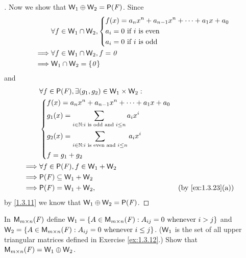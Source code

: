 \begin{proof}[]
	Now we show that \(\W_1 \oplus \W_2 = \ps{\F}\).
	Since
	\begin{align*}
		         & \forall f \in \mathsf{W}_1 \cap \mathsf{W}_2, \begin{dcases}
			                                         f(x) = a_n x^n + a_{n - 1} x^n + \cdots + a_1 x + a_0 \\
			                                         a_i = 0 \text{ if } i \text{ is even}                 \\
			                                         a_i = 0 \text{ if } i \text{ is odd}
		                                         \end{dcases} \\
		\implies & \forall f \in \mathsf{W}_1 \cap \mathsf{W}_2, f = \mathit{0}                                               \\
		\implies & \mathsf{W}_1 \cap \mathsf{W}_2 = \left\lbrace\mathit{0}\right\rbrace
	\end{align*}
	and
	\begin{align*}
		         & \forall f \in \ps{\F}, \exists (g_1, g_2) \in \W_1 \times \W_2 :                                 \\
		         & \begin{dcases}
			           f(x) = a_n x^n + a_{n - 1} x^n + \cdots + a_1 x + a_0              \\
			           g_1(x) = \sum_{i \in \N : i \text{ is odd and } i \leq n} a_i x^i  \\
			           g_2(x) = \sum_{i \in \N : i \text{ is even and } i \leq n} a_i x^i \\
			           f = g_1 + g_2
		           \end{dcases}                           \\
		\implies & \forall f \in \ps{\F}, f \in \W_1 + \W_2                                                         \\
		\implies & \ps{\F} \subseteq \W_1 + \W_2                                                                    \\
		\implies & \ps{\F} = \W_1 + \W_2,                                                    &  & \by{ex:1.3.23}[a]
	\end{align*}
	by \cref{1.3.11} we know that \(\W_1 \oplus \W_2 = \ps{\F}\).
\end{proof}

\begin{ex}\label{ex:1.3.26}
	In \(\mathsf{M}_{{m} \times n}({\mathit{F}})\) define \(\mathsf{W}_1 = \left\lbrace A \in \mathsf{M}_{{m} \times n}({\mathit{F}}) : A_{i j} = 0 \text{ whenever } i > j\right\rbrace\) and \(\mathsf{W}_2 = \left\lbrace A \in \mathsf{M}_{{m} \times n}({\mathit{F}}) : A_{i j} = 0 \text{ whenever } i \leq j\right\rbrace\).
	(\(\mathsf{W}_1\) is the set of all upper triangular matrices defined in Exercise \cref{ex:1.3.12}.)
	Show that \(\mathsf{M}_{{m} \times n}({\mathit{F}}) = \mathsf{W}_1 \oplus \mathsf{W}_2\).
\end{ex}

